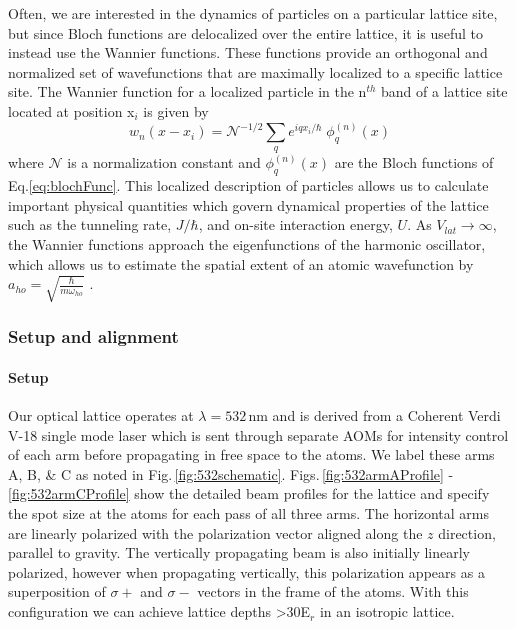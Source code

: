 Often, we are interested in the dynamics of particles on a particular lattice site, but since Bloch functions are delocalized over the entire lattice, it is useful to instead use the Wannier functions. 
These functions provide an orthogonal and normalized set of wavefunctions that are maximally localized to a specific lattice site. 
The Wannier function for a localized particle in the n$^{th}$ band of a lattice site located at position x$_i$ is given by \cite{Jaksch2005}
	\begin{equation} \label{eq:wannier}
		 w_{n}(x - x_i) = \mathcal{N}^{-1/2} \sum_q e^{iqx_i/ \hbar} \; \phi_q^{(n)}(x)
	\end{equation}
where $\mathcal{N}$ is a normalization constant and $\phi_q^{(n)}(x)$ are the Bloch functions of Eq.\;\ref{eq:blochFunc}.
This localized description of particles allows us to calculate important physical quantities which govern dynamical properties of the lattice such as the tunneling rate, $J/ \hbar$, and on-site interaction energy, $U$. 
As $V_{lat}\!\rightarrow\!\infty$, the Wannier functions approach the eigenfunctions of the harmonic oscillator, which allows us to estimate the spatial extent of an atomic wavefunction by $a_{ho} = \sqrt{\frac{\hbar}{m \omega_{ho}}}$ \cite{Jaksch2005}.

\subsubsection{Setup and alignment} \label{sssec:532_align}
\paragraph{Setup}\label{ssec:lattice_setup}

Our optical lattice operates at $\lambda=532\,$nm and is derived from a Coherent Verdi V-18 single mode laser which is sent through separate AOMs for intensity control of each arm before propagating in free space to the atoms. 
We label these arms A, B, \& C as noted in Fig.\,\ref{fig:532schematic}.
Figs.\,\ref{fig:532armAProfile} - \ref{fig:532armCProfile} show the detailed beam profiles for the lattice and specify the spot size at the atoms for each pass of all three arms.
The horizontal arms are linearly polarized with the polarization vector aligned along the $z$ direction, parallel to gravity. 
The vertically propagating beam is also initially linearly polarized, however when propagating vertically, this polarization appears as a superposition of $\sigma+$ and $\sigma-$ vectors in the frame of the atoms.
With this configuration we can achieve lattice depths >$30$E$_r$ in an isotropic lattice. 

